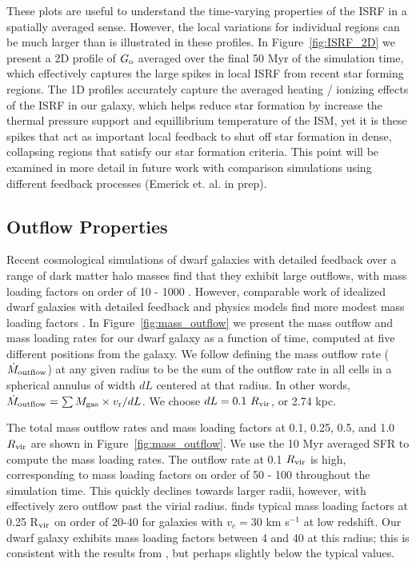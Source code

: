 \documentclass[twocolumn]{aastex61}
\begin{document}
These plots are useful to understand the time-varying properties of the ISRF in a spatially averaged sense. However, the local variations for individual regions can be much larger than is illustrated in these profiles. In Figure~\ref{fig:ISRF_2D} we present a 2D profile of $G_{\rm o}$ averaged over the final 50 Myr of the simulation time, which effectively captures the large spikes in local ISRF from recent star forming regions. The 1D profiles accurately capture the averaged heating / ionizing effects of the ISRF in our galaxy, which helps reduce star formation by increase the thermal pressure support and equillibrium temperature of the ISM, yet it is these spikes that act as important local feedback to shut off star formation in dense, collapsing regions that satisfy our star formation criteria. This point will be examined in more detail in future work with comparison simulations using different feedback processes (Emerick et. al. in prep).

\subsection{Outflow Properties}
\label{sec:outflows}

Recent cosmological simulations of dwarf galaxies with detailed feedback over a range of dark matter halo masses find that they exhibit large outflows, with mass loading factors on order of 10 - 1000 \citep{Muratov2015}. However, comparable work of idealized dwarf galaxies with detailed feedback and physics models find more modest mass loading factors \citep{Hu2016,Hu2017}. In Figure~\ref{fig:mass_outflow} we present the mass outflow and mass loading rates for our dwarf galaxy as a function of time, computed at five different positions from the galaxy. We follow \citet{Muratov2015} defining the mass outflow rate ($\dot{M}_{\rm outflow}$) at any given radius to be the sum of the outflow rate in all cells in a spherical annulus of width $dL$ centered at that radius. In other words, $\dot{M}_{\rm outflow} = \sum M_{\rm gas} \times v_{\rm r} / dL$. We choose $dL = 0.1~R_{\rm vir}$, or 2.74 kpc. 

The total mass outflow rates and mass loading factors at 0.1, 0.25, 0.5, and 1.0 $R_{\rm vir}$ are shown in Figure~\ref{fig:mass_outflow}. We use the 10 Myr averaged SFR to compute the mass loading rates. The outflow rate at 0.1 $R_{\rm vir}$ is high, corresponding to mass loading factors on order of 50 - 100 throughout the simulation time. This quickly declines towards larger radii, however, with effectively zero outflow past the virial radius. \citet{Muratov2015} finds typical mass loading factors at 0.25 R$_{\rm vir}$ on order of 20-40 for galaxies with $v_{c} = 30$ km s$^{-1}$ at low redshift. Our dwarf galaxy exhibits mass loading factors between 4 and 40 at this radius; this is consistent with the results from \citet{Muratov2015}, but perhaps slightly below the typical values. 
\end{document}
